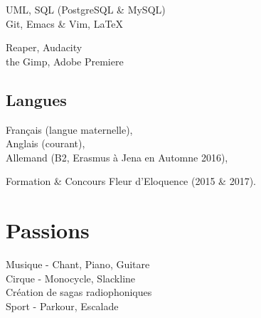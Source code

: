 \documentclass[]{cv-template}
\begin{document}
\begin{minipage}[t]{0.34\textwidth}
UML, SQL (PostgreSQL \& MySQL)\\

Git, Emacs \& Vim, \LaTeX

Reaper, Audacity \\
the Gimp, Adobe Premiere \\ 

\sectionsep
\subsection{Langues}
\faCaretRight  Français (langue maternelle), \\
\faCaretRight  Anglais (courant), \\
\faCaretRight  Allemand (B2, Erasmus à Jena en Automne 2016),

\faCaretRight  Formation \& Concours Fleur d'Eloquence (2015 \& 2017).
\sectionsep



\section{Passions}
Musique - Chant, Piano, Guitare\\
Cirque - Monocycle, Slackline \\
Création de sagas radiophoniques \\
Sport - Parkour, Escalade 
\sectionsep



\end{minipage}
\end{document}
